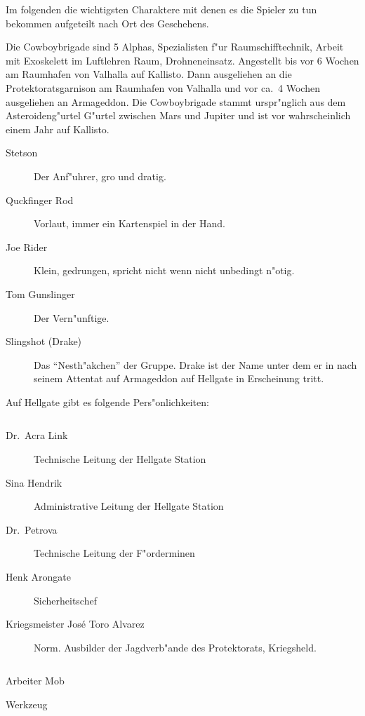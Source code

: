 
Im folgenden die wichtigsten Charaktere mit denen es die Spieler zu tun bekommen aufgeteilt nach Ort des Geschehens.


Die Cowboybrigade sind 5 Alphas, Spezialisten f"ur Raumschifftechnik, Arbeit mit Exoskelett im Luftlehren Raum, Drohneneinsatz.
Angestellt bis vor 6 Wochen am Raumhafen von Valhalla auf Kallisto. Dann ausgeliehen an die Protektoratsgarnison am Raumhafen von Valhalla und vor ca.~4 Wochen ausgeliehen an Armageddon. Die Cowboybrigade stammt urspr"nglich aus dem Asteroideng"urtel G"urtel zwischen Mars und Jupiter und ist vor wahrscheinlich einem Jahr auf Kallisto.

\begin{description}
    \item[Stetson] Der Anf"uhrer, gro\3 und dratig.
    \item[Quckfinger Rod] Vorlaut, immer ein Kartenspiel in der Hand.
    \item[Joe Rider] Klein, gedrungen, spricht nicht wenn nicht unbedingt n"otig.
    \item[Tom Gunslinger] Der Vern"unftige.
    \item[Slingshot (Drake)] Das "`Nesth"akchen"' der Gruppe. Drake ist der Name unter dem er in nach seinem Attentat 
        auf Armageddon auf Hellgate in Erscheinung tritt.
\end{description}

\newpage


Auf Hellgate gibt es folgende Pers"onlichkeiten: 

\begin{column}[l]{0.45}
    \begin{description}
        \item[Dr.~Acra Link] Technische Leitung der Hellgate Station
        \item[Sina Hendrik] Administrative Leitung der Hellgate Station
        \item[Dr.~Petrova] Technische Leitung der F"orderminen
        \item[Henk Arongate] Sicherheitschef    
        \item[Kriegsmeister Jos\'{e} \frqq{}Toro\flqq{} Alvarez] Norm. Ausbilder der Jagdverb"ande des Protektorats, Kriegsheld.
    \end{description}
\end{column}
\begin{column}[r]{0.45}
    \begin{nscsheet}[h]{Arbeiter Mob}
        \nscstats[]
        \nscruler
        \begin{nscinventory}
            \nscitem[Waffen] Werkzeug
        \end{nscinventory}
    \end{nscsheet}
\end{column}


